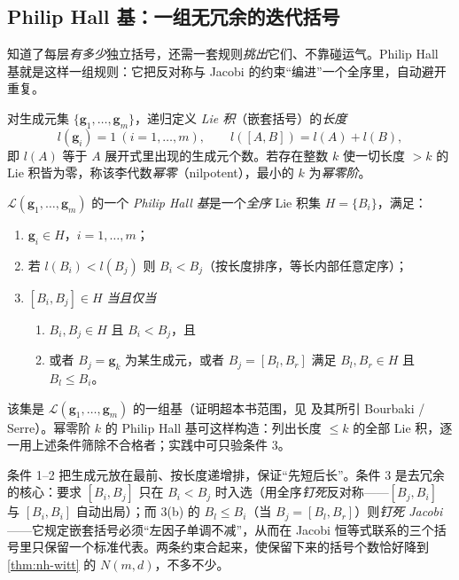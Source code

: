 \subsection{Philip Hall 基：一组无冗余的迭代括号}
\label{sec:nh-philiphall}

知道了每层\emph{有多少}独立括号，还需一套规则\emph{挑出}它们、不靠碰运气。Philip Hall 基就是这样一组规则：它把反对称与 Jacobi 的约束“编进”一个全序里，自动避开重复。

\begin{definition}\label{def:nh-bracket-length}
对生成元集 $\{\mathbf{g}_1,\dots,\mathbf{g}_m\}$，递归定义 \emph{Lie 积}（嵌套括号）的\emph{长度}
\begin{equation}
  l(\mathbf{g}_i)=1\ (i=1,\dots,m),\qquad l([A,B])=l(A)+l(B),
  \label{eq:nh-bracket-length}
\end{equation}
即 $l(A)$ 等于 $A$ 展开式里出现的生成元个数。若存在整数 $k$ 使一切长度 $>k$ 的 Lie 积皆为零，称该李代数\emph{幂零}（nilpotent），最小的 $k$ 为\emph{幂零阶}。
\end{definition}

\begin{definition}\label{def:nh-philiphall}
$\mathcal{L}(\mathbf{g}_1,\dots,\mathbf{g}_m)$ 的一个 \emph{Philip Hall 基}是一个\emph{全序} Lie 积集 $H=\{B_i\}$，满足：
\begin{enumerate}
  \item $\mathbf{g}_i\in H$，$i=1,\dots,m$；
  \item 若 $l(B_i)<l(B_j)$ 则 $B_i<B_j$（按长度排序，等长内部任意定序）；
  \item $[B_i,B_j]\in H$ \emph{当且仅当}
  \begin{enumerate}
    \item $B_i,B_j\in H$ 且 $B_i<B_j$，且
    \item 或者 $B_j=\mathbf{g}_k$ 为某生成元，或者 $B_j=[B_l,B_r]$ 满足 $B_l,B_r\in H$ 且 $B_l\le B_i$。
  \end{enumerate}
\end{enumerate}
该集是 $\mathcal{L}(\mathbf{g}_1,\dots,\mathbf{g}_m)$ 的一组基（证明超本书范围，见\cite{murray1994mathematical} 及其所引 Bourbaki / Serre）。幂零阶 $k$ 的 Philip Hall 基可这样构造：列出长度 $\le k$ 的全部 Lie 积，逐一用上述条件筛除不合格者；实践中可只验条件 3。
\end{definition}

\begin{insight}[三条规则各挡掉哪种冗余]\label{ins:nh-phall-why}
条件 1--2 把生成元放在最前、按长度递增排，保证“先短后长”。条件 3 是去冗余的核心：要求 $[B_i,B_j]$ 只在 $B_i<B_j$ 时入选（用全序\emph{钉死}反对称——$[B_j,B_i]$ 与 $[B_i,B_i]$ 自动出局）；而 3(b) 的 $B_l\le B_i$（当 $B_j=[B_l,B_r]$）则\emph{钉死 Jacobi}——它规定嵌套括号必须“左因子单调不减”，从而在 Jacobi 恒等式联系的三个括号里只保留一个标准代表。两条约束合起来，使保留下来的括号个数恰好降到 \cref{thm:nh-witt} 的 $N(m,d)$，不多不少。
\end{insight}


